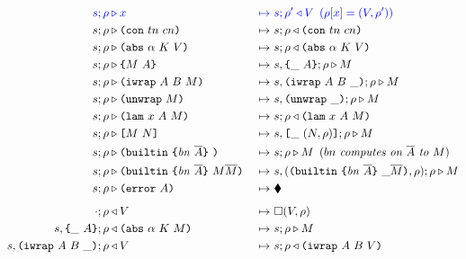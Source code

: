 \documentclass[../zerepoch-core-specification.tex]{subfiles}
\begin{document}
\begin{figure}[!ht]
  \ContinuedFloat
\hspace*{-1cm}\begin{subfigure}[c]{\linewidth}  %
    \begin{alignat*}{2}
      \blue{s; \rho} & \bcompute \blue{x}          &~\bmapsto~&\blue{s;\rho^{\prime} \return V \enspace (\rho[x] = (V,\rho^{\prime}))} \\
       s; \rho &\compute \con{tn}{cn}             &~\mapsto~& s;\rho \return \con{tn}{cn}\\
       s; \rho &\compute \abs{\alpha}{K}{V}       &~\mapsto~& s;\rho \return \abs{\alpha}{K}{V}\\
       s; \rho &\compute \inst{M}{A}              &~\mapsto~& s,\inInstLeftFrame{A};\rho \compute M\\
       s; \rho &\compute \wrap{A}{B}{M}           &~\mapsto~& s,\inWrapRightFrame{A}{B};\rho  \compute M\\ 
       s; \rho &\compute \unwrap{M}               &~\mapsto~& s,\inUnwrapFrame{};\rho  \compute M\\
       s; \rho &\compute \lam{x}{A}{M}            &~\mapsto~& s;\rho \return \lam{x}{A}{M}\\
       s; \rho &\compute \app{M}{N}               &~\mapsto~& s,\inAppLeftFrame{(N,\rho)};\rho \compute M\\
       s; \rho &\compute \builtin{bn}{\repetition{A}}{} &~\mapsto~& s;\rho \compute M \enspace (\textit{$bn$ computes on $\repetition{A}$ to $M$})\\
       s; \rho &\compute \builtin{bn}{\repetition{A}}{M \repetition{M}} &~\mapsto~& s,(\inBuiltin{bn}{\repetition{A}}{}{\_}{\repetition{M}}, \rho);\rho \compute M\\
       s; \rho &\compute \error{A}                &~\mapsto~& \ckerror{}\\
  \\[-10pt] %
       \cdot; \rho &\return V                     &~\mapsto~& \square (V, \rho)\\
       s,\inInstLeftFrame{A}; \rho                &\return \abs{\alpha}{K}{M} &~\mapsto~& s;\rho \compute{M} \\
       s,\inWrapRightFrame{A}{B}; \rho            &\return V &~\mapsto~& s;\rho \return \wrap{A}{B}{V}\\

\end{alignat*}
\end{subfigure}
\end{figure}
\end{document}
